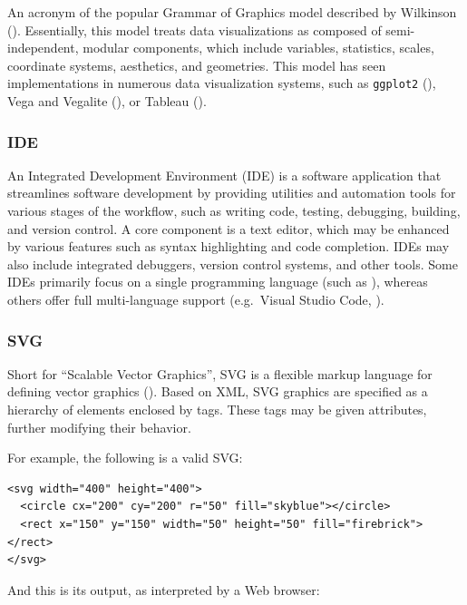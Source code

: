 \documentclass[
  openany]{book}
\theoremstyle{definition}
\theoremstyle{definition}
\theoremstyle{definition}
\theoremstyle{definition}
\theoremstyle{remark}
\begin{document}
An acronym of the popular Grammar of Graphics model described by Wilkinson (). Essentially, this model treats data visualizations as composed of semi-independent, modular components, which include variables, statistics, scales, coordinate systems, aesthetics, and geometries. This model has seen implementations in numerous data visualization systems, such as \texttt{ggplot2} (), Vega and Vegalite (), or Tableau ().

\subsubsection{IDE}\label{ide}

An Integrated Development Environment (IDE) is a software application that streamlines software development by providing utilities and automation tools for various stages of the workflow, such as writing code, testing, debugging, building, and version control. A core component is a text editor, which may be enhanced by various features such as syntax highlighting and code completion. IDEs may also include integrated debuggers, version control systems, and other tools. Some IDEs primarily focus on a single programming language (such as ), whereas others offer full multi-language support (e.g.~Visual Studio Code, ).

\subsubsection{SVG}\label{svg}

Short for ``Scalable Vector Graphics'', SVG is a flexible markup language for defining vector graphics (). Based on XML, SVG graphics are specified as a hierarchy of elements enclosed by tags. These tags may be given attributes, further modifying their behavior.

For example, the following is a valid SVG:

\begin{verbatim}
<svg width="400" height="400">
  <circle cx="200" cy="200" r="50" fill="skyblue"></circle>
  <rect x="150" y="150" width="50" height="50" fill="firebrick"></rect>
</svg>
\end{verbatim}

And this is its output, as interpreted by a Web browser:
\end{document}
